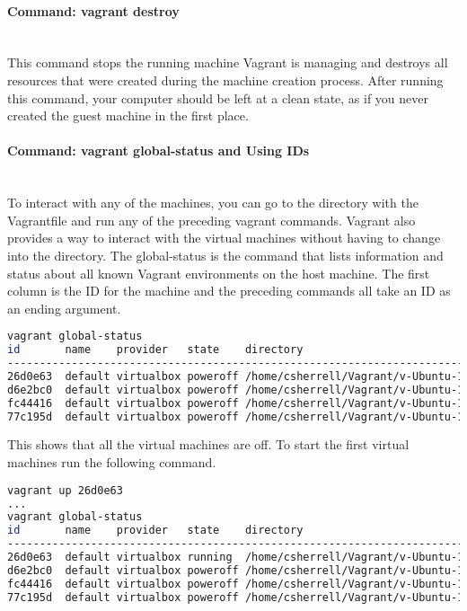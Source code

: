 \paragraph{Command: {\color{red} vagrant destroy}} ~\\
This command stops the running machine Vagrant is managing and destroys all resources that were created during the machine creation process. After running this command, your computer should be left at a clean state, as if you never created the guest machine in the first place.

\paragraph{Command: {\color{red} vagrant global-status} and Using IDs} ~\\

To interact with any of the machines, you can go to
the directory with the Vagrantfile and run any of the preceding vagrant commands. Vagrant also provides a way to interact with the virtual machines without having to change into the directory. The global-status is the command that lists information and status about all known Vagrant environments
on the host machine.  The first column is the ID for the machine and the preceding commands all take an ID as an ending argument.
\lstset{basicstyle=\tiny}
\begin{lstlisting}[language=bash]
vagrant global-status
id       name    provider   state    directory
------------------------------------------------------------------------------------------------
26d0e63  default virtualbox poweroff /home/csherrell/Vagrant/v-Ubuntu-14.04-Bootstrap
d6e2bc0  default virtualbox poweroff /home/csherrell/Vagrant/v-Ubuntu-14.04-Rabbit-02
fc44416  default virtualbox poweroff /home/csherrell/Vagrant/v-Ubuntu-14.04-Rabbit-01
77c195d  default virtualbox poweroff /home/csherrell/Vagrant/v-Ubuntu-14.04-Rabbit-Cassandra-01
\end{lstlisting}


This shows that all the virtual machines are off. To start the first virtual machines run the following command.

\begin{lstlisting}[language=bash]
vagrant up 26d0e63
...
vagrant global-status
id       name    provider   state    directory
------------------------------------------------------------------------------------------------
26d0e63  default virtualbox running  /home/csherrell/Vagrant/v-Ubuntu-14.04-Bootstrap
d6e2bc0  default virtualbox poweroff /home/csherrell/Vagrant/v-Ubuntu-14.04-Rabbit-02
fc44416  default virtualbox poweroff /home/csherrell/Vagrant/v-Ubuntu-14.04-Rabbit-01
77c195d  default virtualbox poweroff /home/csherrell/Vagrant/v-Ubuntu-14.04-Rabbit-Cassandra-01
\end{lstlisting}

